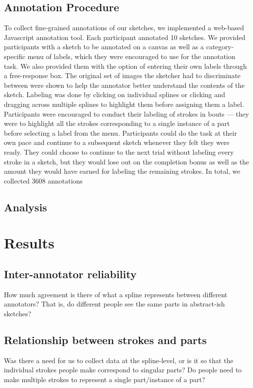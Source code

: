\documentclass[10pt,letterpaper]{article}
\begin{document}
\subsection{Annotation Procedure}


To collect fine-grained annotations of our sketches, we implemented a web-based Javascript annotation tool. 
Each participant annotated 10 sketches. We provided participants with a sketch to be annotated on a canvas as well as a category-specific menu of labels, which they were encouraged to use for the annotation task. We also provided them with the option of entering their own labels through a free-response box. 
The original set of images the sketcher had to discriminate between were shown to help the annotator better understand the contents of the sketch.
Labeling was done by clicking on individual splines or clicking and dragging across multiple splines to highlight them before assigning them a label.
Participants were encouraged to conduct their labeling of strokes in bouts — they were to highlight all the strokes corresponding to a single instance of a part before selecting a label from the menu. 
Participants could do the task at their own pace and continue to a subsequent sketch whenever they felt they were ready. They could choose to continue to the next trial without labeling every stroke in a sketch, but they would lose out on the completion bonus as well as the amount they would have earned for labeling the remaining strokes.
\noindent In total, we collected 3608 annotations


\subsection{Analysis}


\section{Results}
\subsection{Inter-annotator reliability}
How much agreement is there of what a spline represents between different annotators? That is, do different people see the same parts in abstract-ish sketches?

\subsection{Relationship between strokes and parts}
 Was there a need for us to collect data at the spline-level, or is it so that the individual strokes people make correspond to singular parts?
 Do people need to make multiple strokes to represent a single part/instance of a part?
\end{document}
